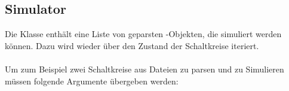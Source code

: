 \subsection{Simulator}
Die Klasse  enthält eine Liste von geparsten -Objekten, die simuliert werden können. Dazu wird wieder über den Zustand der Schaltkreise iteriert.
\\\\
Um zum Beispiel zwei Schaltkreise aus Dateien zu parsen und zu Simulieren müssen folgende Argumente übergeben werden:\\
